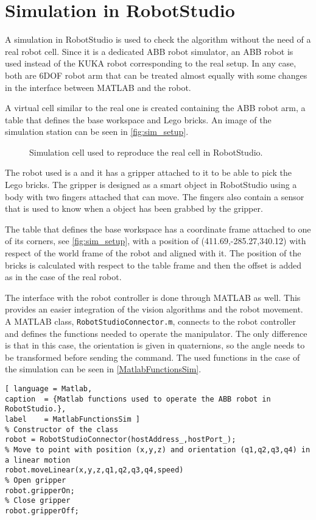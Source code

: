 \chapter{Simulation in RobotStudio}\label{chap:simulation}
A simulation in RobotStudio \cite{robotStudio} is used to check the algorithm without the need of a real robot cell. Since it is a dedicated ABB robot simulator, an ABB robot is used instead of the KUKA robot corresponding to the real setup. In any case, both are 6DOF robot arm that can be treated almost equally with some changes in the interface between MATLAB and the robot. 

A virtual cell similar to the real one is created containing the ABB robot arm, a table that defines the base workspace and Lego bricks. An image of the simulation station can be seen in \autoref{fig:sim_setup}.
\begin{figure}[H]
    \caption{Simulation cell used to reproduce the real cell in RobotStudio.}
    \label{fig:sim_setup}
\end{figure}

The robot used is a  and it has a gripper attached to it to be able to pick the Lego bricks. The gripper is designed as a smart object in RobotStudio using a body with two fingers attached that can move. The fingers also contain a sensor that is used to know when a object has been grabbed by the gripper.

The table that defines the base workspace has a coordinate frame attached to one of its corners, see \autoref{fig:sim_setup}, with a position of (411.69,-285.27,340.12) with respect of the world frame of the robot and aligned with it. The position of the bricks is calculated with respect to the table frame and then the offset is added as in the case of the real robot.

The interface with the robot controller is done through MATLAB as well. This provides an easier integration of the vision algorithms and the robot movement. A MATLAB class, \lstinline[style=matlabinline]{RobotStudioConnector.m}, connects to the robot controller and defines the functions needed to operate the manipulator. The only difference is that in this case, the orientation is given in quaternions, so the angle needs to be transformed before sending the command. The used functions in the case of the simulation can be seen in \autoref{MatlabFunctionsSim}.

\begin{lstlisting}[ language = Matlab,
caption  = {Matlab functions used to operate the ABB robot in RobotStudio.},
label    = MatlabFunctionsSim ]
% Constructor of the class
robot = RobotStudioConnector(hostAddress_,hostPort_);
% Move to point with position (x,y,z) and orientation (q1,q2,q3,q4) in a linear motion
robot.moveLinear(x,y,z,q1,q2,q3,q4,speed)
% Open gripper
robot.gripperOn;
% Close gripper
robot.gripperOff;
\end{lstlisting}

